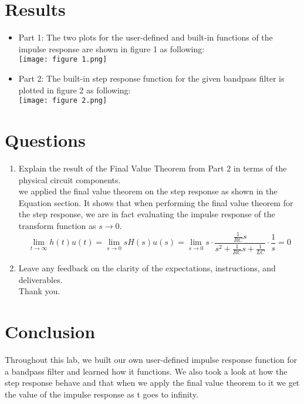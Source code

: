 \documentclass[12pt]{report}
\begin{document}
\section{Results}
\begin{itemize}
    \item Part 1:
    The two plots for the user-defined and built-in functions of the impulse response are shown in figure 1 as following:\\
    \texttt{[image: figure 1.png]}\\
    
     \item Part 2:
    The built-in step response function for the given bandpass filter is plotted in figure 2 as following:\\
    \texttt{[image: figure 2.png]}
    
\end{itemize}


\section{Questions}

\begin{enumerate}
    \item 
    Explain the result of the Final Value Theorem from Part 2 in terms of the physical circuit components.\\
    we applied the final value theorem on the step response as shown in the Equation section. It shows that when performing the final value theorem for the step response, we are in fact evaluating the impulse response of the transform function as $s\to 0$.
    $$\lim_{t\to \infty} h(t)u(t) = \lim_{s\to 0} sH(s)u(s)= \lim_{s\to 0} s\cdot \frac{\frac{1}{RC}s}{s^2+\frac{1}{RC}s+\frac{1}{LC}} \cdot \frac{1}{s} = 0 $$
    \item
    Leave any feedback on the clarity of the expectations, instructions, and deliverables.\\
     Thank you.
\end{enumerate}

\section{Conclusion}
Throughout this lab, we built our own user-defined impulse response function for a bandpass filter and learned how it functions. We also took a look at how the step response behave and that when we apply the final value theorem to it we get the value of the impulse response as t goes to infinity.
\end{document}
